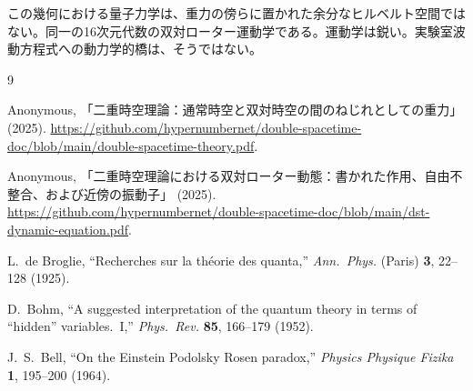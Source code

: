 \documentclass[a4paper]{article}
\begin{document}
この幾何における量子力学は、重力の傍らに置かれた余分なヒルベルト空間ではない。同一の16次元代数の双対ローター運動学である。運動学は鋭い。実験室波動方程式への動力学的橋は、そうではない。

\begin{thebibliography}{9}
\raggedright

Anonymous,
「二重時空理論：通常時空と双対時空の間のねじれとしての重力」 (2025).
\url{https://github.com/hypernumbernet/double-spacetime-doc/blob/main/double-spacetime-theory.pdf}.

Anonymous,
「二重時空理論における双対ローター動態：書かれた作用、自由不整合、および近傍の振動子」 (2025).
\url{https://github.com/hypernumbernet/double-spacetime-doc/blob/main/dst-dynamic-equation.pdf}.

L.~de Broglie,
``Recherches sur la th\'eorie des quanta,''
\textit{Ann.\ Phys.} (Paris) \textbf{3}, 22--128 (1925).

D.~Bohm,
``A suggested interpretation of the quantum theory in terms of ``hidden'' variables.\ I,''
\textit{Phys.\ Rev.} \textbf{85}, 166--179 (1952).

J.~S.~Bell,
``On the Einstein Podolsky Rosen paradox,''
\textit{Physics Physique Fizika} \textbf{1}, 195--200 (1964).

\end{thebibliography}
\end{document}
